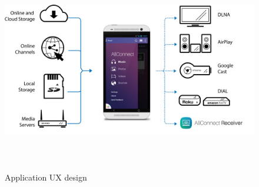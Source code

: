 \begin{figure}[htb]
\centering \includegraphics[height=9cm]{charts/allconnect-app}
\caption{Application UX design \label{chart5}}
\end{figure}

